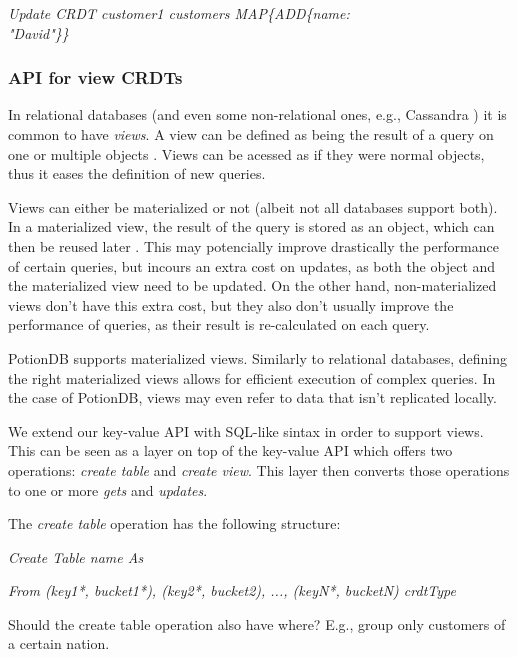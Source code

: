 \documentclass{vldb}
\newcommand{\grumbler}[2]{{\color{red}{\bf #1:} #2}}
\newcommand{\andre}[1]{\grumbler{andre}{#1}}
\newcommand{\emphvspace}{0.5\baselineskip}
\newcommand{\lineemph}[1]{\vspace{\emphvspace}\hspace{2em}\emph{#1}\vspace{\emphvspace}}
\newcommand{\firstblockemph}[1]{\vspace{\emphvspace}\hspace{2em}\emph{#1}}
\newcommand{\lastblockemph}[1]{\hspace{2em}\emph{#1}\vspace{\emphvspace}}
\begin{document}
\lineemph{Update CRDT customer1 customers MAP\{ADD\{name: \\"David"\}\}}

\subsubsection{API for view CRDTs}
\label{subsubsec:APIVew}

In relational databases (and even some non-relational ones, e.g., Cassandra \cite{???}) it is common to have \emph{views}. 
A view can be defined as being the result of a query on one or multiple objects \cite{???}.
Views can be acessed as if they were normal objects, thus it eases the definition of new queries.

Views can either be materialized or not (albeit not all databases support both). %
In a materialized view, the result of the query is stored as an object, which can then be reused later \cite{???}.
This may potencially improve drastically the performance of certain queries, but incours an extra cost on updates, as both the object and the materialized view need to be updated.
On the other hand, non-materialized views don't have this extra cost, but they also don't usually improve the performance of queries, as their result is re-calculated on each query.

PotionDB supports materialized views.
Similarly to relational databases, defining the right materialized views allows for efficient execution of complex queries.
In the case of PotionDB, views may even refer to data that isn't replicated locally.

We extend our key-value API with SQL-like sintax in order to support views.
This can be seen as a layer on top of the key-value API which offers two operations: \emph{create table} and \emph{create view}.
This layer then converts those operations to one or more \emph{gets} and \emph{updates}.

The \emph{create table} operation has the following structure:

\firstblockemph{Create Table name As}

\lastblockemph{From (key1*, bucket1*), (key2*, bucket2), ..., (keyN*, bucketN) crdtType}

\andre{Should the create table operation also have where? E.g., group only customers of a certain nation.}
\end{document}
